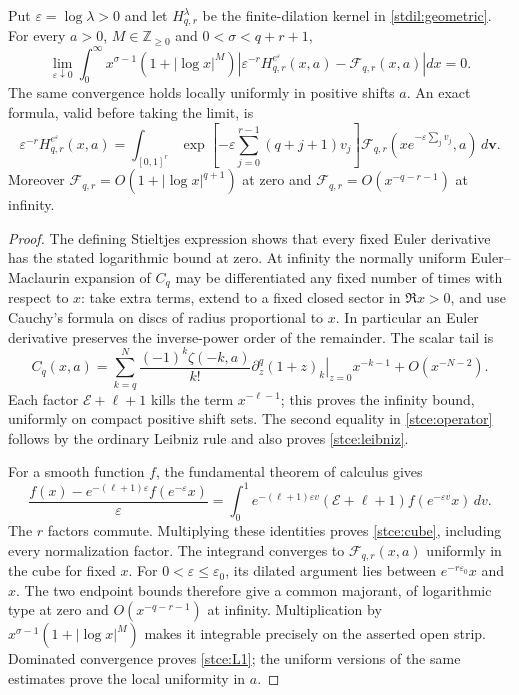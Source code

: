 \begin{theorem}
\label{stce:confluence}
Put $\varepsilon=\log\lambda>0$ and let $H_{q,r}^{\lambda}$ be the
finite-dilation kernel in \eqref{stdil:geometric}.  For every $a>0$,
$M\in\mathbb Z_{\ge0}$ and $0<\sigma<q+r+1$,
\begin{equation}\label{stce:L1}
 \lim_{\varepsilon\downarrow0}\int_0^\infty x^{\sigma-1}
       (1+|\log x|^M)
 \left|\varepsilon^{-r}H_{q,r}^{e^\varepsilon}(x,a)
                  -\mathcal F_{q,r}(x,a)\right|dx=0.
\end{equation}
The same convergence holds locally uniformly in positive shifts $a$.
An exact formula, valid before taking the limit, is
\begin{equation}\label{stce:cube}
 \varepsilon^{-r}H_{q,r}^{e^\varepsilon}(x,a)
 =\int_{[0,1]^r}
       \exp\!\left[-\varepsilon\sum_{j=0}^{r-1}(q+j+1)v_j\right]
       \mathcal F_{q,r}\!\left(xe^{-\varepsilon\sum_jv_j},a\right)
       \,d\mathbf v.
\end{equation}
Moreover $\mathcal F_{q,r}=O(1+|\log x|^{q+1})$ at zero and
$\mathcal F_{q,r}=O(x^{-q-r-1})$ at infinity.
\end{theorem}
\begin{proof}
The defining Stieltjes expression shows that every fixed Euler derivative
has the stated logarithmic bound at zero.  At infinity the normally
uniform Euler--Maclaurin expansion of $C_q$ may be differentiated any
fixed number of times with respect to $x$: take extra terms, extend to a
fixed closed sector in $\Re x>0$, and use Cauchy's formula on discs of
radius proportional to $x$.  In particular an Euler derivative preserves
the inverse-power order of the remainder.  The scalar tail is
\[
 C_q(x,a)=\sum_{k=q}^N
   \frac{(-1)^k\zeta(-k,a)}{k!}
   \left.\partial_z^q(1+z)_k\right|_{z=0}x^{-k-1}
   +O(x^{-N-2}).
\]
Each factor $\mathcal E+\ell+1$ kills the term $x^{-\ell-1}$;
this proves the infinity bound, uniformly on compact positive shift sets.
The second equality in \eqref{stce:operator} follows by the ordinary
Leibniz rule and also proves \eqref{stce:leibniz}.

For a smooth function $f$, the fundamental theorem of calculus gives
\[
 \frac{f(x)-e^{-(\ell+1)\varepsilon}f(e^{-\varepsilon}x)}{\varepsilon}
 =\int_0^1e^{-(\ell+1)\varepsilon v}
   (\mathcal E+\ell+1)f(e^{-\varepsilon v}x)\,dv.
\]
The $r$ factors commute.  Multiplying these identities proves
\eqref{stce:cube}, including every normalization factor.  The integrand
converges to $\mathcal F_{q,r}(x,a)$ uniformly in the cube for fixed $x$.
For $0<\varepsilon\le\varepsilon_0$, its dilated argument lies between
$e^{-r\varepsilon_0}x$ and $x$.  The two endpoint bounds therefore give a
common majorant, of logarithmic type at zero and $O(x^{-q-r-1})$ at
infinity.  Multiplication by $x^{\sigma-1}(1+|\log x|^M)$ makes it
integrable precisely on the asserted open strip.  Dominated convergence
proves \eqref{stce:L1}; the uniform versions of the same estimates prove
the local uniformity in $a$.
\end{proof}

